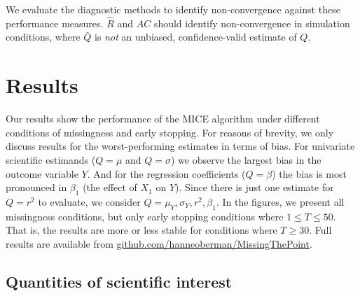 \documentclass[Royal,times,sageh]{sagej}
\begin{document}
We evaluate the diagnostic methods to identify non-convergence against these performance measures. \(\widehat{R}\) and \(AC\) should identify non-convergence in simulation conditions, where \(\bar{Q}\) is \emph{not} an unbiased, confidence-valid estimate of \(Q\).

\hypertarget{results}{%
\section{Results}\label{results}}

Our results show the performance of the MICE algorithm under different conditions of missingness and early stopping. For reasons of brevity, we only discuss results for the worst-performing estimates in terms of bias. For univariate scientific estimands (\(Q=\mu\) and \(Q=\sigma\)) we observe the largest bias in the outcome variable \(Y\). And for the regression coefficients (\(Q=\beta\)) the bias is most pronounced in \(\beta_1\) (the effect of \(X_1\) on \(Y\)). Since there is just one estimate for \(Q=r^2\) to evaluate, we consider \(Q=\mu_Y, \sigma_Y,r^2, \beta_1\). In the figures, we present all missingness conditions, but only early stopping conditions where \(1 \leq T\leq50\). That is, the results are more or less stable for conditions where \(T \geq 30\). Full results are available from \href{https://github.com/hanneoberman/MissingThePoint}{github.com/hanneoberman/MissingThePoint}.

\hypertarget{quantities-of-scientific-interest}{%
\subsection{Quantities of scientific interest}\label{quantities-of-scientific-interest}}
\end{document}
